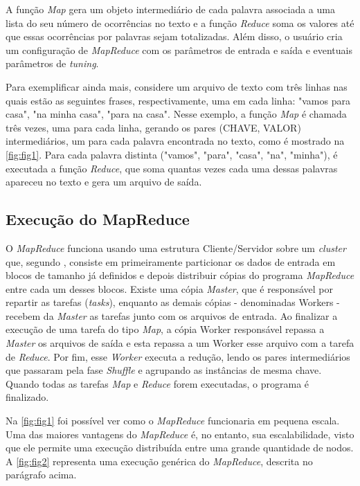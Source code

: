\newpage
A função \textit{Map} gera um objeto intermediário de cada palavra associada a uma lista do seu número de ocorrências no texto e a função \textit{Reduce} soma os valores até que essas ocorrências por palavras sejam totalizadas. Além disso, o usuário cria um configuração de \textit{MapReduce} com os parâmetros de entrada e saída e eventuais parâmetros de \textit{\gls{tuning}}.

Para exemplificar ainda mais, considere um arquivo de texto com três linhas nas quais estão as seguintes frases, respectivamente, uma em cada linha: "vamos para casa", "na minha casa", "para na casa". Nesse exemplo, a função \textit{Map} é chamada três vezes, uma para cada linha, gerando os pares (CHAVE, VALOR) intermediários, um para cada palavra encontrada no texto, como é mostrado na \autoref{fig:fig1}. Para cada palavra distinta ("vamos", "para", "casa", "na", "minha"), é executada a função \textit{Reduce}, que soma quantas vezes cada uma dessas palavras apareceu no texto e gera um arquivo de saída.


\subsection{Execução do MapReduce}\label{ssec:execucaomapreduce}

O \textit{MapReduce} funciona usando uma estrutura Cliente/Servidor sobre um \textit{cluster} que, segundo \textcite{MapReduce08}, consiste em primeiramente particionar os dados de entrada em blocos de tamanho já definidos e depois distribuir cópias do programa \textit{MapReduce} entre cada um desses blocos. Existe uma cópia \textit{Master}, que é responsável por repartir as tarefas (\textit{tasks}), enquanto as demais cópias - denominadas Workers - recebem da \textit{Master} as tarefas junto com os arquivos de entrada. Ao finalizar a execução de uma tarefa do tipo \textit{Map}, a cópia Worker responsável repassa a \textit{Master} os arquivos de saída e esta repassa a um Worker esse arquivo com a tarefa de \textit{Reduce}. Por fim, esse \textit{Worker} executa a redução, lendo os pares intermediários que passaram pela fase \textit{Shuffle} e agrupando as instâncias de mesma chave. Quando todas as tarefas \textit{Map} e \textit{Reduce} forem executadas, o programa é finalizado.

Na \autoref{fig:fig1} foi possível ver como o \textit{MapReduce} funcionaria em pequena escala. Uma das maiores vantagens do \textit{MapReduce} é, no entanto, sua escalabilidade, visto que ele permite uma execução distribuída entre uma grande quantidade de nodos. A \autoref{fig:fig2}  representa uma execução genérica do \textit{MapReduce}, descrita no parágrafo acima.

